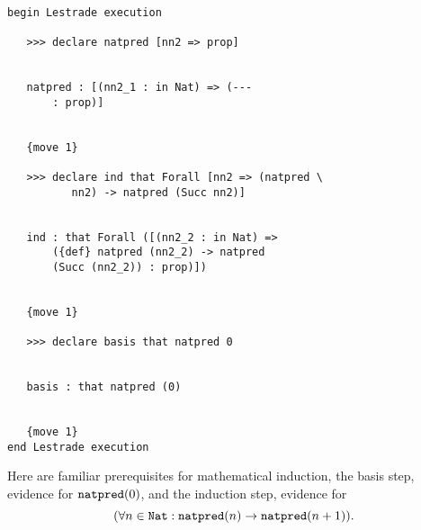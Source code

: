 \documentclass[12pt]{article}
\begin{document}
\begin{verbatim}

begin Lestrade execution

   >>> declare natpred [nn2 => prop]


   natpred : [(nn2_1 : in Nat) => (--- 
       : prop)]


   {move 1}

   >>> declare ind that Forall [nn2 => (natpred \
          nn2) -> natpred (Succ nn2)]


   ind : that Forall ([(nn2_2 : in Nat) => 
       ({def} natpred (nn2_2) -> natpred 
       (Succ (nn2_2)) : prop)])


   {move 1}

   >>> declare basis that natpred 0


   basis : that natpred (0)


   {move 1}
end Lestrade execution
\end{verbatim}

Here are familiar prerequisites for mathematical induction, the basis step, evidence for ${\tt natpred}(0)$, and the induction step, evidence for $$(\forall n \in {\tt Nat}:{\tt natpred}(n) \rightarrow {\tt natpred}(n+1) ).$$
\end{document}
